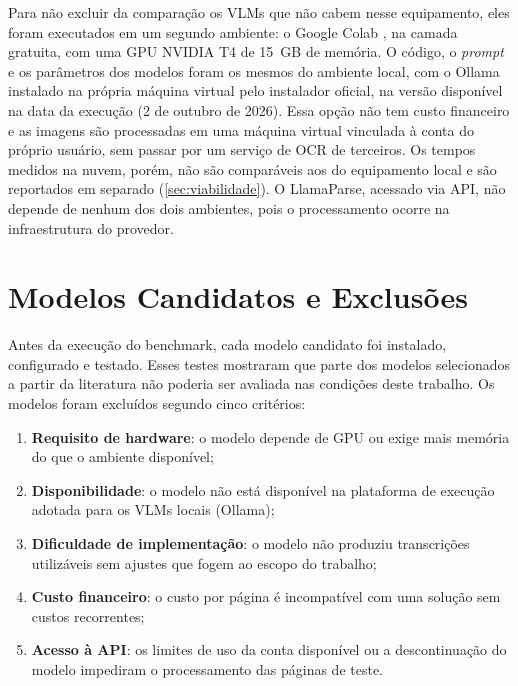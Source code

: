 \documentclass[noabntexcite,oneside]{ufsc-thesis-rn46-2019}
\begin{document}
Para não excluir da comparação os VLMs que não cabem nesse equipamento, eles foram
executados em um segundo ambiente: o Google Colab \cite{google_colab}, na camada gratuita,
com uma GPU NVIDIA T4 de 15~GB de memória. O código, o \textit{prompt} e os parâmetros dos
modelos foram os mesmos do ambiente local, com o Ollama instalado na própria máquina
virtual pelo instalador oficial, na versão disponível na data da execução (2 de outubro
de 2026). Essa opção não
tem custo financeiro e as imagens são processadas em uma máquina virtual vinculada à conta
do próprio usuário, sem passar por um serviço de OCR de terceiros. Os tempos medidos na
nuvem, porém, não são comparáveis aos do equipamento local e são reportados em separado
(\autoref{sec:viabilidade}). O LlamaParse, acessado via API, não depende de nenhum dos dois ambientes, pois o
processamento ocorre na infraestrutura do provedor.

\section{Modelos Candidatos e Exclusões}
\label{sec:excluidos}

Antes da execução do benchmark, cada modelo candidato foi instalado, configurado e
testado. Esses testes mostraram que parte dos modelos selecionados a partir da literatura
não poderia ser avaliada nas condições deste trabalho. Os modelos foram excluídos segundo
cinco critérios:

\begin{enumerate}
    \item \textbf{Requisito de hardware}: o modelo depende de GPU ou exige mais memória
    do que o ambiente disponível;
    \item \textbf{Disponibilidade}: o modelo não está disponível na plataforma de
    execução adotada para os VLMs locais (Ollama);
    \item \textbf{Dificuldade de implementação}: o modelo não produziu transcrições
    utilizáveis sem ajustes que fogem ao escopo do trabalho;
    \item \textbf{Custo financeiro}: o custo por página é incompatível com uma solução
    sem custos recorrentes;
    \item \textbf{Acesso à API}: os limites de uso da conta disponível ou a
    descontinuação do modelo impediram o processamento das páginas de teste.
\end{enumerate}
\end{document}
